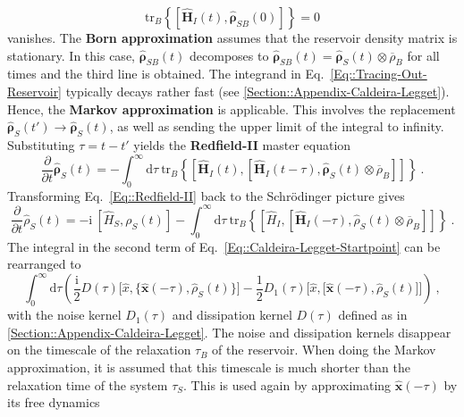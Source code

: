 		\begin{equation}
		\text{tr}_B \left\lbrace \left[\boldsymbol{\hat{H}}_I(t), \boldsymbol{\hat{\rho}}_{SB}(0)\right] \right \rbrace =	0
	\end{equation}
	vanishes. The \textbf{Born approximation} assumes that the reservoir density matrix is stationary. In this case, $\boldsymbol{\hat{\rho}}_{SB}(t)$ decomposes to $\boldsymbol{\hat{\rho}}_{SB}(t) = \boldsymbol{\hat{\rho}}_S(t) \otimes \overline{\rho}_B$ for all times and the third line is obtained. The integrand in  Eq.~\eqref{Eq::Tracing-Out-Reservoir} typically decays rather fast (see \autoref{Section::Appendix-Caldeira-Legget}). Hence, the \textbf{Markov approximation} \cite{landi2022nonequilibrium} is applicable. This involves the replacement $\boldsymbol{\hat{\rho}}_S(t') \rightarrow \boldsymbol{\hat{\rho}}_S(t)$, as well as  sending the upper limit of the integral to infinity. Substituting $\tau =t - t'$ yields the \textbf{Redfield-II} master equation
	\begin{equation} \label{Eq::Redfield-II}
		\frac{\partial}{\partial t} \boldsymbol{\hat{\rho}}_S(t) = - \int_{0}^{\infty} \text{d}\tau~ \text{tr}_B \left\{  \left[\boldsymbol{\hat{H}}_I(t), \left[\boldsymbol{\hat{H}}_I(t - \tau), \boldsymbol{\hat{\rho}}_S(t) \otimes \overline{\rho}_B \right]\right]  \right\} ~.
	\end{equation}
	Transforming Eq.~\eqref{Eq::Redfield-II} back to the Schrödinger picture gives
	\begin{equation} \label{Eq::Caldeira-Legget-Startpoint}
		\frac{\partial}{\partial t} {\hat{\rho}}_S(t) =	-\mathrm{i}~\left[\hat{H}_S, \rho_S(t)\right] - \int_{0}^{\infty} \text{d}\tau~ \text{tr}_B \left\{  \left[{\hat{H}}_I, \left[{\boldsymbol{\hat{H}}}_I(- \tau), {\hat{\rho}}_S(t) \otimes \overline{\rho}_B \right]\right]  \right\}~.
	\end{equation}
	The integral in the second term of Eq.~\eqref{Eq::Caldeira-Legget-Startpoint} can be rearranged to
	\begin{equation} \label{Eq::CD-Trace-with-Kernels}
		\int_{0}^{\infty} \text{d}\tau \left(\frac{\mathrm{i}}{2} D(\tau) \Big[\hat{x}, \big\{\boldsymbol{\hat{x}}(-\tau), \hat{\rho}_S(t)\big\} \Big] - \frac{1}{2} D_1(\tau) \Big[\hat{x}, \big[\boldsymbol{\hat{x}}(-\tau) , \hat{\rho}_S(t)\big]\Big]\right)~,
	\end{equation}
	with the noise kernel $D_1(\tau)$ and dissipation kernel $D(\tau)$ defined as in \autoref{Section::Appendix-Caldeira-Legget}. The noise and dissipation kernels disappear on the timescale of the relaxation $\tau_B$ of the reservoir. When doing the Markov approximation, it is assumed that this timescale is much shorter than the relaxation time of the system $\tau_S$. This is used again by approximating $\boldsymbol{\hat{x}}(-\tau)$ by its free dynamics
